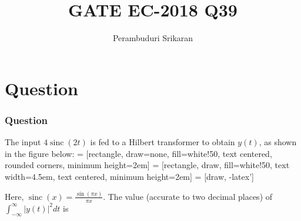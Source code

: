 \documentclass{beamer}
\title{GATE EC-2018 Q39}
\author{Perambuduri Srikaran}
\institute{IITH AI}
\DeclareMathOperator{\sinc}{sinc}
\begin{document}
\providecommand{\pr}[1]{\ensuremath{\Pr\left(#1\right)}}
\providecommand{\qfunc}[1]{\ensuremath{Q\left(#1\right)}}
\providecommand{\sbrak}[1]{\ensuremath{{}\left[#1\right]}}
\providecommand{\lsbrak}[1]{\ensuremath{{}\left[#1\right.}}
\providecommand{\rsbrak}[1]{\ensuremath{{}\left.#1\right]}}
\providecommand{\brak}[1]{\ensuremath{\left(#1\right)}}
\providecommand{\lbrak}[1]{\ensuremath{\left(#1\right.}}
\providecommand{\rbrak}[1]{\ensuremath{\left.#1\right)}}
\providecommand{\cbrak}[1]{\ensuremath{\left\{#1\right\}}}
\providecommand{\lcbrak}[1]{\ensuremath{\left\{#1\right.}}
\providecommand{\rcbrak}[1]{\ensuremath{\left.#1\right\}}}
\providecommand{\fourier}{\overset{\mathcal{F}}{ \rightleftharpoons}}

\begin{frame}
\titlepage
\end{frame}
\section{Question}
\begin{frame}
\frametitle{Question}
\begin{block}{}
The input $4\sinc{\brak{2t}}$ is fed to a Hilbert transformer to obtain $y\brak{t}$, as shown in the figure below:
 = [rectangle, draw=none, fill=white!50,
    text centered, rounded corners, minimum height=2em]
 = [rectangle, draw, fill=white!50,
    text width=4.5em, text centered, minimum height=2em]
 = [draw, -latex']
\begin{center}
\end{center}
Here, $\sinc{\brak{x}} = \frac{\sin\brak{\pi x}}{\pi x}$. The value (accurate to two decimal places) of $\int_{-\infty}^{\infty} |y\brak{t}|^2 dt$ is
\end{block}
\end{frame}
\end{document}
